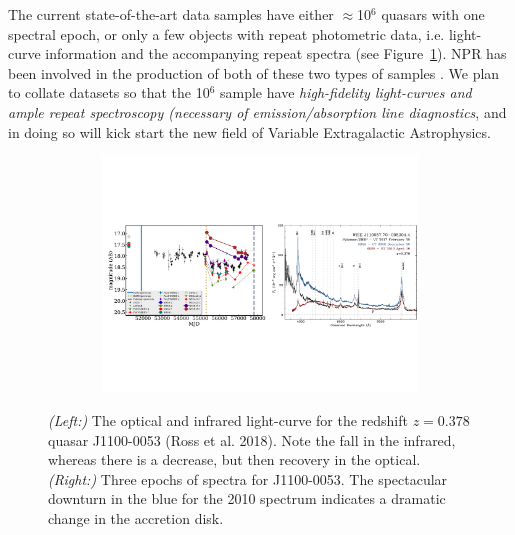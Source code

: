 \documentclass[oneside, a4paper, onecolumn, 11pt]{article}
\begin{document}
\smallskip
\noindent
The current state-of-the-art data samples have either
$\approx$10$^{6}$ quasars with one spectral epoch, or only a few
objects with repeat photometric data, i.e. light-curve information and
the accompanying repeat spectra (see Figure~\ref{fig:J110057}).  NPR
has been involved in the production of both of these two types of
samples \citep{MacLeod2016, Paris2017}. We plan to collate datasets so
that the 10$^{6}$ sample have {\it high-fidelity light-curves and
ample repeat spectroscopy (necessary of emission/absorption line
diagnostics}, and in doing so will kick start the new field of
Variable Extragalactic Astrophysics.

\begin{figure}[h]
  \begin{center}
    \hspace{-0.5cm}
    \includegraphics[height=6.25cm,width=17.2cm]
    {figures/J110057_LC_Spectra_20171024.pdf}
    \vspace{-10pt}
    \caption{\small    %
      {\it (Left:)} The optical and infrared light-curve for the redshift $z=0.378$ quasar 
      J1100-0053 (Ross et al. 2018). 
      Note the fall in the infrared, whereas there is a decrease, but 
      then recovery in the optical. 
      {\it (Right:)} 
      Three epochs of spectra for J1100-0053. 
      The spectacular downturn in the blue for the 2010 spectrum 
      indicates a dramatic change in the accretion disk.
    }
  \vspace{-22pt}
 \label{fig:J110057}
\end{center}
\end{figure}
\end{document}
